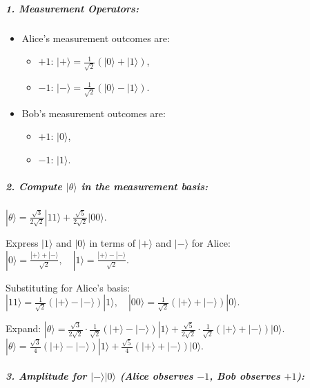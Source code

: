 \documentclass[11pt]{article}
\providecommand{\tightlist}{%
      \setlength{\itemsep}{0pt}\setlength{\parskip}{0pt}}
\begin{document}
\subparagraph{1. Measurement Operators:}\label{measurement-operators}

\begin{itemize}
\tightlist
\item
  Alice's measurement outcomes are:

  \begin{itemize}
  \tightlist
  \item
    \(+1\): \(|+\rangle = \frac{1}{\sqrt{2}}(|0\rangle + |1\rangle)\),
  \item
    \(-1\): \(|-\rangle = \frac{1}{\sqrt{2}}(|0\rangle - |1\rangle)\).
  \end{itemize}
\item
  Bob's measurement outcomes are:

  \begin{itemize}
  \tightlist
  \item
    \(+1\): \(|0\rangle\),
  \item
    \(-1\): \(|1\rangle\).
  \end{itemize}
\end{itemize}

\subparagraph{\texorpdfstring{2. Compute \(|\theta\rangle\) in the
measurement
basis:}{2. Compute \textbar\textbackslash theta\textbackslash rangle in the measurement basis:}}\label{compute-thetarangle-in-the-measurement-basis}

\(|\theta\rangle = \frac{\sqrt{3}}{2\sqrt{2}} |11\rangle + \frac{\sqrt{5}}{2\sqrt{2}} |00\rangle.\)

Express \(|1\rangle\) and \(|0\rangle\) in terms of \(|+\rangle\) and
\(|-\rangle\) for Alice:
\(|0\rangle = \frac{|+\rangle + |-\rangle}{\sqrt{2}}, \quad |1\rangle = \frac{|+\rangle - |-\rangle}{\sqrt{2}}.\)

Substituting for Alice's basis:
\(|11\rangle = \frac{1}{\sqrt{2}}(|+\rangle - |-\rangle)|1\rangle, \quad |00\rangle = \frac{1}{\sqrt{2}}(|+\rangle + |-\rangle)|0\rangle.\)

Expand:
\(|\theta\rangle = \frac{\sqrt{3}}{2\sqrt{2}} \cdot \frac{1}{\sqrt{2}} (|+\rangle - |-\rangle)|1\rangle + \frac{\sqrt{5}}{2\sqrt{2}} \cdot \frac{1}{\sqrt{2}} (|+\rangle + |-\rangle)|0\rangle.\)
\(|\theta\rangle = \frac{\sqrt{3}}{4} (|+\rangle - |-\rangle)|1\rangle + \frac{\sqrt{5}}{4} (|+\rangle + |-\rangle)|0\rangle.\)

\subparagraph{\texorpdfstring{3. Amplitude for \(|-\rangle|0\rangle\)
(Alice observes \(-1\), Bob observes
\(+1\)):}{3. Amplitude for \textbar-\textbackslash rangle\textbackslash rangle (Alice observes -1, Bob observes +1):}}\label{amplitude-for--rangle0rangle-alice-observes--1-bob-observes-1}
\end{document}
